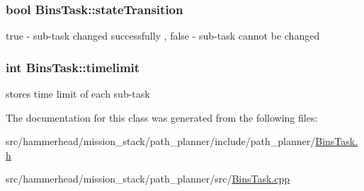 \subsubsection[{\texorpdfstring{state\+Transition}{stateTransition}}]{\setlength{\rightskip}{0pt plus 5cm}bool Bins\+Task\+::state\+Transition}\hypertarget{classBinsTask_a96feda59c1d8c1657a93b8541703c6f3}{}\label{classBinsTask_a96feda59c1d8c1657a93b8541703c6f3}


true -\/ sub-\/task changed successfully , false -\/ sub-\/task cannot be changed 

\subsubsection[{\texorpdfstring{timelimit}{timelimit}}]{\setlength{\rightskip}{0pt plus 5cm}int Bins\+Task\+::timelimit}\hypertarget{classBinsTask_ad227a105c8a9d4fbd4b11ac8292013cc}{}\label{classBinsTask_ad227a105c8a9d4fbd4b11ac8292013cc}


stores time limit of each sub-\/task 



The documentation for this class was generated from the following files\+:\begin{DoxyCompactItemize}
\item 
src/hammerhead/mission\+\_\+stack/path\+\_\+planner/include/path\+\_\+planner/\hyperlink{BinsTask_8h}{Bins\+Task.\+h}\item 
src/hammerhead/mission\+\_\+stack/path\+\_\+planner/src/\hyperlink{BinsTask_8cpp}{Bins\+Task.\+cpp}\end{DoxyCompactItemize}
